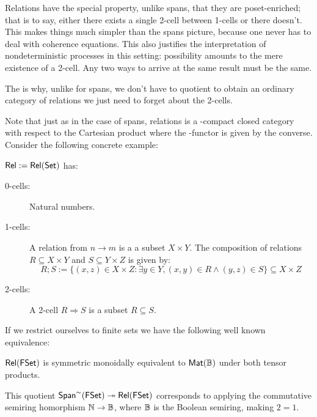 Relations have the special property, unlike spans, that they are poset-enriched; that is to say, either there exists a single 2-cell between 1-cells or there doesn't. This makes things much simpler than the spans picture, because one never has to deal with coherence equations.  This also justifies the interpretation of nondeterministic processes in this setting: possibility amounts to the mere existence of a 2-cell.  Any two ways to arrive at the same result must be the same.


The is why, unlike for spans,  we don't have to quotient to obtain an ordinary category of relations we just need to forget about the 2-cells.

Note that just as in the case of spans, relations is a \dag-compact closed category with respect to the Cartesian product where the \dag-functor is given by the converse.
Consider the following concrete example:
\begin{example}
$\mathsf{Rel}:=\mathsf{Rel}(\mathsf{Set})$ has:
\begin{description}
\item[0-cells:] Natural numbers.
\item[1-cells:] A relation from $n\to m$ is a a subset $X \times Y$.
The composition of relations $R \subseteq X \times Y$  and $S \subseteq Y \times Z$ is given by:
$$
R;S := \{  (x,z) \in X\times Z: \exists y \in Y, (x,y) \in R \wedge (y,z) \in S \} \subseteq X\times Z
$$ 
\item[2-cells:] 
A 2-cell $R\Rightarrow S$ is a subset $R\subseteq S$.
\end{description}
\end{example}
If we restrict ourselves to finite sets we have the following well known equivalence:
\begin{lemma}
$\mathsf{Rel}(\mathsf{FSet})$ is symmetric monoidally equivalent to $\mathsf{Mat}(\mathbb{B})$ under both tensor products. 
\end{lemma}
This quotient $\mathsf{Span}^{\sim}(\mathsf{FSet})\twoheadrightarrow \mathsf{Rel}(\mathsf{FSet})$ corresponds to applying the commutative semiring homorphism $\mathbb{N}\to \mathbb{B}$, where $\mathbb{B}$ is the Boolean semiring, making $2=1$.

